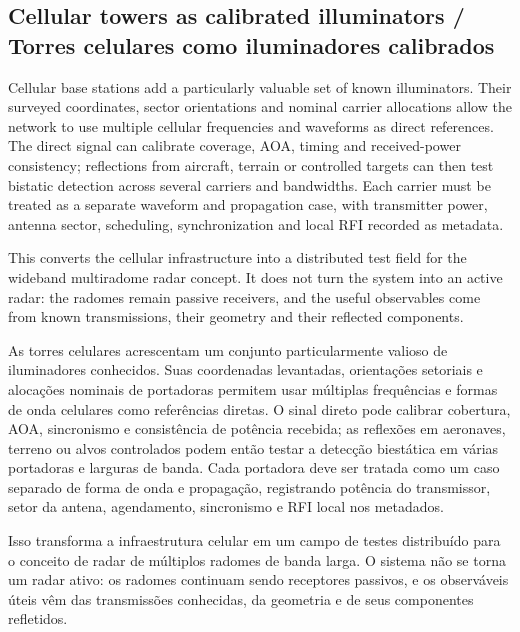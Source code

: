 \subsection*{Cellular towers as calibrated illuminators / Torres celulares como iluminadores calibrados}
Cellular base stations add a particularly valuable set of known illuminators. Their surveyed coordinates, sector orientations and nominal carrier allocations allow the network to use multiple cellular frequencies and waveforms as direct references. The direct signal can calibrate coverage, AOA, timing and received-power consistency; reflections from aircraft, terrain or controlled targets can then test bistatic detection across several carriers and bandwidths. Each carrier must be treated as a separate waveform and propagation case, with transmitter power, antenna sector, scheduling, synchronization and local RFI recorded as metadata.

This converts the cellular infrastructure into a distributed test field for the wideband multiradome radar concept. It does not turn the system into an active radar: the radomes remain passive receivers, and the useful observables come from known transmissions, their geometry and their reflected components.

As torres celulares acrescentam um conjunto particularmente valioso de iluminadores conhecidos. Suas coordenadas levantadas, orientações setoriais e alocações nominais de portadoras permitem usar múltiplas frequências e formas de onda celulares como referências diretas. O sinal direto pode calibrar cobertura, AOA, sincronismo e consistência de potência recebida; as reflexões em aeronaves, terreno ou alvos controlados podem então testar a detecção biestática em várias portadoras e larguras de banda. Cada portadora deve ser tratada como um caso separado de forma de onda e propagação, registrando potência do transmissor, setor da antena, agendamento, sincronismo e RFI local nos metadados.

Isso transforma a infraestrutura celular em um campo de testes distribuído para o conceito de radar de múltiplos radomes de banda larga. O sistema não se torna um radar ativo: os radomes continuam sendo receptores passivos, e os observáveis úteis vêm das transmissões conhecidas, da geometria e de seus componentes refletidos.

